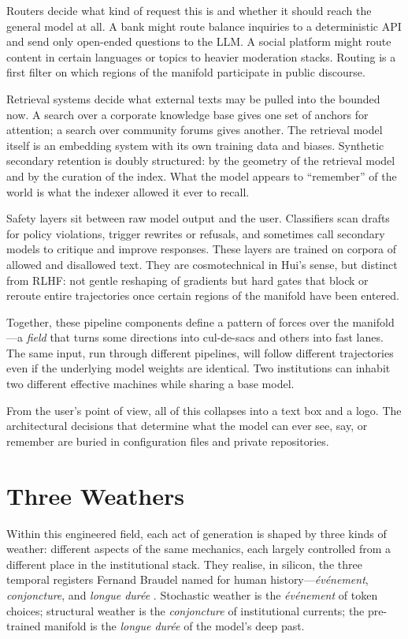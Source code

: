 \documentclass[12pt,a4paper]{article}
\begin{document}
Routers decide what kind of request this is and whether it should reach the general model at all. A bank might route balance inquiries to a deterministic API and send only open-ended questions to the LLM. A social platform might route content in certain languages or topics to heavier moderation stacks. Routing is a first filter on which regions of the manifold participate in public discourse.

Retrieval systems decide what external texts may be pulled into the bounded now. A search over a corporate knowledge base gives one set of anchors for attention; a search over community forums gives another. The retrieval model itself is an embedding system with its own training data and biases. Synthetic secondary retention is doubly structured: by the geometry of the retrieval model and by the curation of the index. What the model appears to ``remember'' of the world is what the indexer allowed it ever to recall.

Safety layers sit between raw model output and the user. Classifiers scan drafts for policy violations, trigger rewrites or refusals, and sometimes call secondary models to critique and improve responses. These layers are trained on corpora of allowed and disallowed text. They are cosmotechnical in Hui's sense, but distinct from RLHF: not gentle reshaping of gradients but hard gates that block or reroute entire trajectories once certain regions of the manifold have been entered.

Together, these pipeline components define a pattern of forces over the manifold---a \emph{field} that turns some directions into cul-de-sacs and others into fast lanes. The same input, run through different pipelines, will follow different trajectories even if the underlying model weights are identical. Two institutions can inhabit two different effective machines while sharing a base model.

From the user's point of view, all of this collapses into a text box and a logo. The architectural decisions that determine what the model can ever see, say, or remember are buried in configuration files and private repositories.

\section{Three Weathers}

Within this engineered field, each act of generation is shaped by three kinds of weather: different aspects of the same mechanics, each largely controlled from a different place in the institutional stack. They realise, in silicon, the three temporal registers Fernand Braudel named for human history---\emph{\'ev\'enement}, \emph{conjoncture}, and \emph{longue dur\'ee} \cite{braudel1972mediterranean}. Stochastic weather is the \emph{\'ev\'enement} of token choices; structural weather is the \emph{conjoncture} of institutional currents; the pre-trained manifold is the \emph{longue dur\'ee} of the model's deep past.
\end{document}
